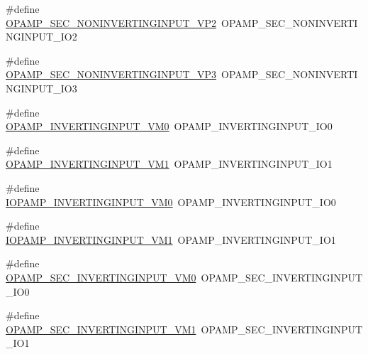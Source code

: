 \begin{DoxyCompactItemize}
\item 
\#define \hyperlink{group___h_a_l___o_p_a_m_p___aliased___defines_ga99d279a0ad7e685d456f454d4eb90c02}{O\+P\+A\+M\+P\+\_\+\+S\+E\+C\+\_\+\+N\+O\+N\+I\+N\+V\+E\+R\+T\+I\+N\+G\+I\+N\+P\+U\+T\+\_\+\+V\+P2}~O\+P\+A\+M\+P\+\_\+\+S\+E\+C\+\_\+\+N\+O\+N\+I\+N\+V\+E\+R\+T\+I\+N\+G\+I\+N\+P\+U\+T\+\_\+\+I\+O2
\item 
\#define \hyperlink{group___h_a_l___o_p_a_m_p___aliased___defines_gac8152b9a1e42f8513a907918f2db651b}{O\+P\+A\+M\+P\+\_\+\+S\+E\+C\+\_\+\+N\+O\+N\+I\+N\+V\+E\+R\+T\+I\+N\+G\+I\+N\+P\+U\+T\+\_\+\+V\+P3}~O\+P\+A\+M\+P\+\_\+\+S\+E\+C\+\_\+\+N\+O\+N\+I\+N\+V\+E\+R\+T\+I\+N\+G\+I\+N\+P\+U\+T\+\_\+\+I\+O3
\item 
\#define \hyperlink{group___h_a_l___o_p_a_m_p___aliased___defines_gaa6ab36e92c4c9e5f08a766d722cc12e2}{O\+P\+A\+M\+P\+\_\+\+I\+N\+V\+E\+R\+T\+I\+N\+G\+I\+N\+P\+U\+T\+\_\+\+V\+M0}~O\+P\+A\+M\+P\+\_\+\+I\+N\+V\+E\+R\+T\+I\+N\+G\+I\+N\+P\+U\+T\+\_\+\+I\+O0
\item 
\#define \hyperlink{group___h_a_l___o_p_a_m_p___aliased___defines_ga1d73eb5e8d6e1c4e22cbdd896586375a}{O\+P\+A\+M\+P\+\_\+\+I\+N\+V\+E\+R\+T\+I\+N\+G\+I\+N\+P\+U\+T\+\_\+\+V\+M1}~O\+P\+A\+M\+P\+\_\+\+I\+N\+V\+E\+R\+T\+I\+N\+G\+I\+N\+P\+U\+T\+\_\+\+I\+O1
\item 
\#define \hyperlink{group___h_a_l___o_p_a_m_p___aliased___defines_ga16004eef1f4113ba471e24cd51570a78}{I\+O\+P\+A\+M\+P\+\_\+\+I\+N\+V\+E\+R\+T\+I\+N\+G\+I\+N\+P\+U\+T\+\_\+\+V\+M0}~O\+P\+A\+M\+P\+\_\+\+I\+N\+V\+E\+R\+T\+I\+N\+G\+I\+N\+P\+U\+T\+\_\+\+I\+O0
\item 
\#define \hyperlink{group___h_a_l___o_p_a_m_p___aliased___defines_ga375723a55ef087438b5614070f7daab6}{I\+O\+P\+A\+M\+P\+\_\+\+I\+N\+V\+E\+R\+T\+I\+N\+G\+I\+N\+P\+U\+T\+\_\+\+V\+M1}~O\+P\+A\+M\+P\+\_\+\+I\+N\+V\+E\+R\+T\+I\+N\+G\+I\+N\+P\+U\+T\+\_\+\+I\+O1
\item 
\#define \hyperlink{group___h_a_l___o_p_a_m_p___aliased___defines_ga2deb27c0ae55e51ce5e529b8ca12a5bf}{O\+P\+A\+M\+P\+\_\+\+S\+E\+C\+\_\+\+I\+N\+V\+E\+R\+T\+I\+N\+G\+I\+N\+P\+U\+T\+\_\+\+V\+M0}~O\+P\+A\+M\+P\+\_\+\+S\+E\+C\+\_\+\+I\+N\+V\+E\+R\+T\+I\+N\+G\+I\+N\+P\+U\+T\+\_\+\+I\+O0
\item 
\#define \hyperlink{group___h_a_l___o_p_a_m_p___aliased___defines_ga64e070f02a3a612aa9307cd3d7be8cb9}{O\+P\+A\+M\+P\+\_\+\+S\+E\+C\+\_\+\+I\+N\+V\+E\+R\+T\+I\+N\+G\+I\+N\+P\+U\+T\+\_\+\+V\+M1}~O\+P\+A\+M\+P\+\_\+\+S\+E\+C\+\_\+\+I\+N\+V\+E\+R\+T\+I\+N\+G\+I\+N\+P\+U\+T\+\_\+\+I\+O1
\item 

\end{DoxyCompactItemize}
